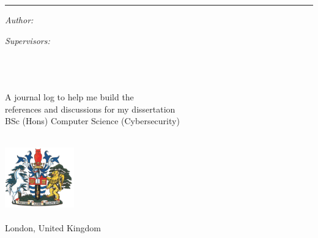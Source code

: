 \begin{titlepage}
  \doublespacing{}
  \large
  \hfill
  \vfill
  \vspace*{0.5cm}
  \begin{center}
    \doublespacing{}
    \textcolor{Blue}{\huge\textbf{\myTitle}}
  \end{center}
  \vspace{1.25cm}
  \hrule
  \vspace{1.5cm}
  \onehalfspacing{}
  \begin{center}

    \begin{minipage}[t]{0.5\textwidth}
      \begin{flushleft}
        \emph{Author:}\\
        \href{\myWebsite}{{\myFirstName} \textsc{\myLastName}}
      \end{flushleft}
    \end{minipage}
    \begin{minipage}[t]{0.4\textwidth}
      \begin{flushright}
        \emph{Supervisors:} \\
        \href{\myProfWebsite}{{\myProfTitle} {\myProfFirstName} \textsc{\myProfLastName}}\\
        \href{\myOtherProfWebsite}{{\myOtherProfTitle} {\myOtherProfFirstName} \textsc{\myOtherProfLastName}}\\
      \end{flushright}
    \end{minipage}\\[1.5cm]

    A journal log to help me build the\\
    references and discussions for my dissertation\\
    {BSc (Hons) Computer Science (Cybersecurity)}\\[1cm]

    \myDepartment\\
    \myFaculty{}

    \hfill
    \vfill

    \includegraphics[width=3cm]{../shared/greenwich-coat-of-arms}\\
    \href{https://www.gre.ac.uk/}{\myUni}\\
    London, United Kingdom\\[2em]
    {\mySubmissionMonth} {\mySubmissionYear}
  \end{center}
\end{titlepage}
